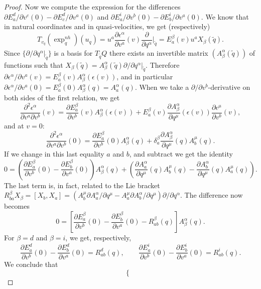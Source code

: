 \documentclass[11pt]{article}
\begin{document}
\begin{proof}
Now we compute the expression for the differences $ {\partial E_a^d}/{\partial v^c}(0)-{\partial E_c^d}/{\partial v^a}(0) $ and ${\partial E_a^i}/{\partial v^b}(0)-{\partial E_b^i}/{\partial v^a}(0)$. 
We know that in natural coordinates and in quasi-velocities, we get (respectively) 
\[
    T_{v_q}(\exp^{nh}_q)(u_q) = u^a\frac{\partial \epsilon^\alpha}{\partial v^a}(v) \frac{\partial}{\partial q^\alpha}|_{\tilde{q}} = E_a^\beta(v) u^a X_\beta(\tilde{q}).
		\]
Since $\{{\partial}/{\partial q^\alpha}|_{\tilde q}\}$ is a basis for $T_{\tilde q} Q$ there  exists an invertible matrix  $(A_\beta^\alpha(\tilde{q}))$ of functions such that
$X_\beta(\tilde{q})=A_\beta^\alpha(\tilde{q}) {\partial}/{\partial q^\alpha}|_{\tilde{q}}$. Therefore 
$ {\partial \epsilon^\alpha}/{\partial v^a}(v)=E_a^\beta(v) A_\beta^\alpha(\epsilon(v))$, and  in particular ${\partial \epsilon^\alpha}/{\partial v^a}(0)=E_a^\beta(0) A_\beta^\alpha(q)=A_a^\alpha(q)$.
When we take a $\partial/\partial v^b$-derivative on both sides of the first relation, we get
\[
    \frac{\partial^2 \epsilon^\alpha}{\partial v^a\partial v^b}(v)=\frac{\partial E_a^\beta}{\partial v^b}(v) A_\beta^\alpha(\epsilon(v))+E_a^\beta(v) \frac{\partial A_\beta^\alpha}{\partial q^\mu}(\epsilon(v))\frac{\partial \epsilon^\mu}{\partial v^b}(v),
	\]
and at  $v=0$:
\[
\frac{\partial^2 \epsilon^\alpha}{\partial v^a\partial v^b}(0)=\frac{\partial E_a^\beta}{\partial v^b}(0) A_\beta^\alpha(q)+\delta_a^\beta \frac{\partial A_\beta^\alpha}{\partial q^\mu}(q)
A^\mu_b(q).
\]
If we change in this last equality  $a$ and $b$, and subtract we get the identity
$$
 0=\left(\frac{\partial E_a^\beta}{\partial v^b}(0)-\frac{\partial E_b^\beta}{\partial v^a}(0)\right) A_\beta^\alpha(q)+\left( \frac{\partial A_a^\alpha}{\partial q^\mu}(q)A^\mu_b(q)- \frac{\partial A_b^\alpha}{\partial q^\mu}(q)A^\mu_a(q) \right).
$$
The last term is, in fact, related to the Lie bracket
$ R^\beta_{ba} X_\beta= [X_b,X_a]=(A^\mu_b{\partial A_a^\alpha}/{\partial q^\mu}- A^\mu_a{\partial A_b^\alpha}/{\partial q^\mu}) {\partial}/{\partial q^\alpha}$. 
The difference now becomes
$$ 
0=\left[\frac{\partial E_a^\beta}{\partial v^b}(0)-\frac{\partial E_b^\beta}{\partial v^a}(0) -R_{ab}^\beta(q)\right]A^\alpha_{\beta}(q).
$$
For $\beta=d$ and $\beta=i$, we get, respectively,
 $$
\frac{\partial E_a^d}{\partial v^b}(0)-\frac{\partial E_b^d}{\partial v^a}(0)=R_{ab}^d(q) ,
\qquad \frac{\partial E_a^i}{\partial v^b}(0)-\frac{\partial E_b^i}{\partial v^a}(0) =R_{ab}^i(q).
$$
We conclude that 
\begin{equation}
    \begin{cases}

\end{cases}
\end{equation}
\end{proof}
\end{document}
